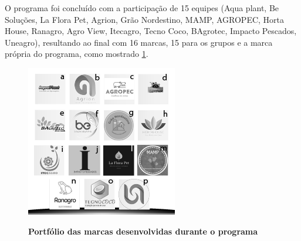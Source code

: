 O programa foi concluído  com a participação de 15 equipes (Aqua plant, Be Soluções, La Flora Pet, Agrion, Grão Nordestino, MAMP, AGROPEC, Horta House, Ranagro, Agro View, Itecagro, Tecno Coco, BAgrotec, Impacto Pescados, Uneagro), resultando ao final com 16 marcas, 15 para os grupos e a marca própria do programa, como mostrado  \ref{figura_12}.




\begin{figure}[H]
\centering
\caption{\textbf{Portfólio das marcas desenvolvidas durante o programa}}
\includegraphics[scale=3]{Imagens/portfolio.png}
\label{figura_12}
\end{figure}


